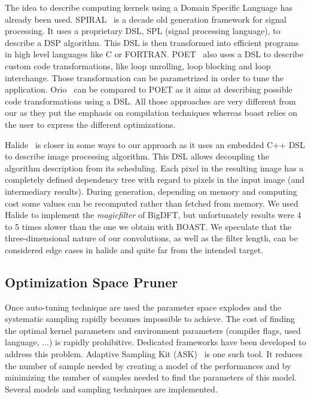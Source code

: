 \documentclass[11pt, a4paper, twoside]{montblanc}
\begin{document}
  The idea to describe computing kernels using a Domain Specific Language has
already been used. SPIRAL~\cite{puschel2004spiral} is a decade old generation
framework for signal processing. It uses a proprietary DSL, SPL (signal
processing language), to describe a DSP algorithm. This DSL is then transformed
into efficient programs in high level languages like C or FORTRAN.
POET~\cite{yi2007poet} also uses a DSL to describe custom code transformations,
like loop unrolling, loop blocking and loop interchange. Those transformation
can be parametrized in order to tune the application. Orio~\cite{Hart2009:Orio}
can be compared to POET as it aims at describing possible code transformations
using a DSL. All those approaches are very different from our as they put the
emphasis on compilation techniques whereas boast relies on the user to express
the different optimizations.

  Halide~\cite{ragan2013halide} is closer in some ways to our approach as it
uses an embedded C++ DSL to describe image processing algorithm. This DSL allows
decoupling the algorithm description from its scheduling. Each pixel in the
resulting image has a completely defined dependency tree with regard to pixels
in the input image (and intermediary results). During generation, depending on
memory and computing cost some values can be recomputed rather than fetched from
memory. We used Halide to implement the \emph{magicfilter} of BigDFT, but
unfortunately results were 4 to 5 times slower than the one we obtain with
BOAST. We speculate that the three-dimensional nature of our convolutions, as
well as the filter length, can be considered edge cases in halide and quite far
from the intended target.

  \subsection{Optimization Space Pruner}

  Once auto-tuning technique are used the parameter space explodes and the
systematic sampling rapidly becomes impossible to achieve. The cost of finding
the optimal kernel parameters and environment parameters (compiler flags, used
language, ...) is rapidly prohibitive. Dedicated frameworks have been developed
to address this problem. Adaptive Sampling Kit (ASK)~\cite{castro2013adaptive}
is one such tool. It reduces the number of sample needed by creating a model of
the performances and by minimizing the number of samples needed to find the
parameters of this model. Several models and sampling techniques are
implemented.
\end{document}
